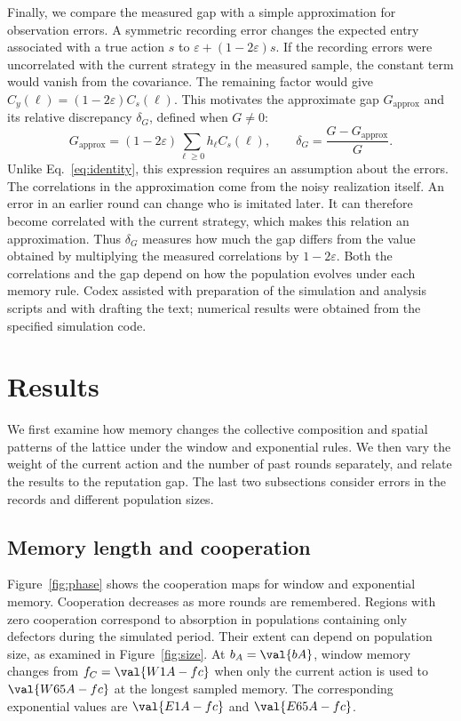 \documentclass[physics,article,submit,moreauthors]{Definitions/mdpi}
\begin{document}
Finally, we compare the measured gap with a simple approximation for observation errors. A symmetric recording error changes the expected entry associated with a true action $s$ to $\varepsilon+(1-2\varepsilon)s$. If the recording errors were uncorrelated with the current strategy in the measured sample, the constant term would vanish from the covariance. The remaining factor would give $C_y(\ell)=(1-2\varepsilon)C_s(\ell)$. This motivates the approximate gap $G_{\mathrm{approx}}$ and its relative discrepancy $\delta_G$, defined when $G\ne0$:
\begin{equation}
 G_{\mathrm{approx}}=(1-2\varepsilon)\sum_{\ell\geq0}h_\ell C_s(\ell),
 \qquad \delta_G=\frac{G-G_{\mathrm{approx}}}{G}.
 \label{eq:approx}
\end{equation}
Unlike Eq.~\eqref{eq:identity}, this expression requires an assumption about the errors. The correlations in the approximation come from the noisy realization itself. An error in an earlier round can change who is imitated later. It can therefore become correlated with the current strategy, which makes this relation an approximation. Thus $\delta_G$ measures how much the gap differs from the value obtained by multiplying the measured correlations by $1-2\varepsilon$. Both the correlations and the gap depend on how the population evolves under each memory rule. Codex assisted with preparation of the simulation and analysis scripts and with drafting the text; numerical results were obtained from the specified simulation code.

\section{Results}\label{sec:results}
We first examine how memory changes the collective composition and spatial patterns of the lattice under the window and exponential rules. We then vary the weight of the current action and the number of past rounds separately, and relate the results to the reputation gap. The last two subsections consider errors in the records and different population sizes.

\subsection{Memory length and cooperation}
Figure~\ref{fig:phase} shows the cooperation maps for window and exponential memory. Cooperation decreases as more rounds are remembered. Regions with zero cooperation correspond to absorption in populations containing only defectors during the simulated period. Their extent can depend on population size, as examined in Figure~\ref{fig:size}. At $b_A=\val{bA}$, window memory changes from $f_C=\val{W1A-fc}$ when only the current action is used to $\val{W65A-fc}$ at the longest sampled memory. The corresponding exponential values are $\val{E1A-fc}$ and $\val{E65A-fc}$.
\end{document}
